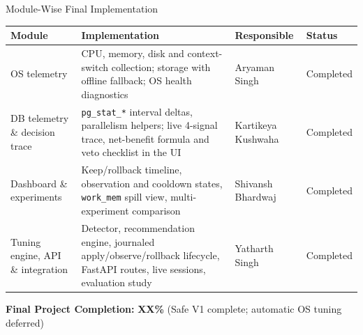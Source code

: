 \documentclass[aspectratio=169,11pt]{beamer}
\newcommand{\fillme}[1]{\textbf{\color{red}#1}}
\begin{document}
\begin{frame}{Module-Wise Final Implementation}

\scriptsize

\begin{center}

\renewcommand{\arraystretch}{1.3}

\begin{tabularx}{.96\textwidth}
{@{}p{2.6cm}X p{2.2cm}p{1.6cm}@{}}

\toprule
\textbf{Module} &
\textbf{Implementation} &
\textbf{Responsible} &
\textbf{Status}\\
\midrule

OS telemetry &
CPU, memory, disk and context-switch collection; storage with offline fallback;
OS health diagnostics &
Aryaman Singh &
Completed\\

DB telemetry \& decision trace &
\texttt{pg\_stat\_*} interval deltas, parallelism helpers; live 4-signal trace,
net-benefit formula and veto checklist in the UI &
Kartikeya Kushwaha &
Completed\\

Dashboard \& experiments &
Keep/rollback timeline, observation and cooldown states, \texttt{work\_mem} spill
view, multi-experiment comparison &
Shivansh Bhardwaj &
Completed\\

Tuning engine, API \& integration &
Detector, recommendation engine, journaled apply/observe/rollback lifecycle,
FastAPI routes, live sessions, evaluation study &
Yatharth Singh &
Completed\\

\bottomrule

\end{tabularx}

\end{center}

\vspace{3mm}

\begin{center}
\colorbox{GEULightBlue}{
\parbox{.75\textwidth}{
\centering
\textbf{Final Project Completion:}
\fillme{XX\%} \quad (Safe V1 complete; automatic OS tuning deferred)
}}
\end{center}

\end{frame}
\end{document}
